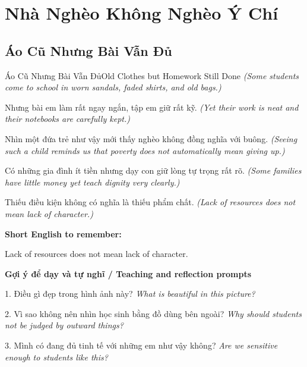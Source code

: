 \chapter{Nhà Nghèo Không Nghèo Ý Chí}

\section{Áo Cũ Nhưng Bài Vẫn Đủ}
\begin{truyen}{Áo Cũ Nhưng Bài Vẫn Đủ}{Old Clothes but Homework Still Done}
\textit{(Some students come to school in worn sandals, faded shirts, and old bags.)}

Nhưng bài em làm rất ngay ngắn, tập em giữ rất kỹ.
\textit{(Yet their work is neat and their notebooks are carefully kept.)}

Nhìn một đứa trẻ như vậy mới thấy nghèo không đồng nghĩa với buông.
\textit{(Seeing such a child reminds us that poverty does not automatically mean giving up.)}

Có những gia đình ít tiền nhưng dạy con giữ lòng tự trọng rất rõ.
\textit{(Some families have little money yet teach dignity very clearly.)}

\end{truyen}

\begin{baihoc}
Thiếu điều kiện không có nghĩa là thiếu phẩm chất.
\textit{(Lack of resources does not mean lack of character.)}
\end{baihoc}

\begin{ghinhoanh}
\textbf{Short English to remember:}

Lack of resources does not mean lack of character.

\end{ghinhoanh}

\begin{tuhocnhanh}
\textbf{Gợi ý để dạy và tự nghĩ / Teaching and reflection prompts}

1. Điều gì đẹp trong hình ảnh này? \textit{What is beautiful in this picture?}

2. Vì sao không nên nhìn học sinh bằng đồ dùng bên ngoài? \textit{Why should students not be judged by outward things?}

3. Mình có đang đủ tinh tế với những em như vậy không? \textit{Are we sensitive enough to students like this?}
\end{tuhocnhanh}
\ngancach

